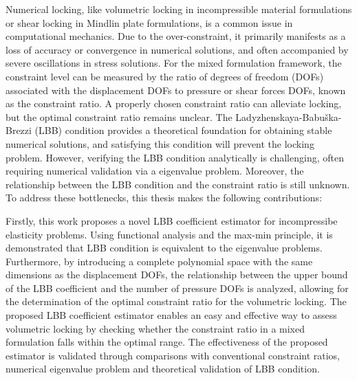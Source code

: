     \begin{abstractEn}
    
    Numerical locking, like volumetric locking in incompressible material formulations or shear locking in Mindlin plate formulations, is a common issue in computational mechanics.
    Due to the over-constraint, it primarily manifests as a loss of accuracy or convergence in numerical solutions, and often accompanied by severe oscillations in stress solutions.
    For the mixed formulation framework, the constraint level can be measured by the ratio of degrees of freedom (DOFs) associated with the displacement DOFs to pressure or shear forces DOFs, known as the constraint ratio.
    A properly chosen constraint ratio can alleviate locking, but the optimal constraint ratio remains unclear.
    The Ladyzhenskaya-Babuška-Brezzi (LBB) condition provides a theoretical foundation for obtaining stable numerical solutions, and satisfying this condition will prevent the locking problem.
    However, verifying the LBB condition analytically is challenging, often requiring numerical validation via a eigenvalue problem. 
    Moreover, the relationship between the LBB condition and the constraint ratio is still unknown. To address these bottlenecks, this thesis makes the following contributions:
    
    Firstly, this work proposes a novel LBB coefficient estimator for incompressibe elasticity problems. Using functional analysis and the max-min principle, it is demonstrated that LBB condition is equivalent to the eigenvalue problems.
    Furthermore, by introducing a complete polynomial space with the same dimensions as the displacement DOFs, the relationship between the upper bound of the LBB coefficient and the number of pressure DOFs is analyzed, allowing for the determination of the optimal constraint ratio for the volumetric locking.
    The proposed LBB coefficient estimator enables an easy and effective way to assess volumetric locking by checking whether the constraint ratio in a mixed formulation falls within the optimal range. The effectiveness of the proposed estimator is validated through comparisons with conventional constraint ratios, numerical eigenvalue problem and theoretical validation of LBB condition.
    

\end{abstractEn}
